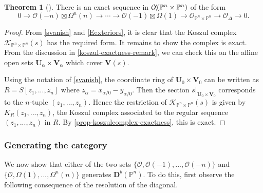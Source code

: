 \documentclass[a4paper]{article}
\theoremstyle{definition}
\newtheorem{theorem}[defn]{Theorem}
\theoremstyle{remark}
\newcommand{\deri}{\mathbf{D}}
\newcommand{\Pn}{\ensuremath{{\mathbb{P}^n}}}
\DeclareMathOperator{\coh}{\mathcal{C\kern -2pt o\kern -2pt h\kern -1pt}}
\begin{document}
\begin{theorem}[]\label{resolution-of-diagonal}
    There is an exact sequence in \(\coh(\Pn \times \Pn)\) of the form 
    \[0\rightarrow \mathscr{O}(-n)\boxtimes \Omega^n(n)
    \rightarrow \cdots \rightarrow \mathscr{O}(-1)\boxtimes 
    \Omega(1) \rightarrow \mathscr{O}_{\Pn\times \Pn} \rightarrow \mathscr{O}_\Delta
    \rightarrow 0.\]
    \begin{proof} 
        From \cref{svanish} and \cref{Eexteriors}, it is clear that the Koszul
        complex \(\mathscr{K}_{\Pn\times \Pn}(s)\) has the required form. It
        remains to show the complex is exact. From the discussion in
        \cref{koszul-exactness-remark}, we can check this on the affine open
        sets \(\mathbf{U}_\alpha \times \mathbf{V}_\alpha\) which cover
        \(\mathbf{V}(s)\). 

        Using the notation of \cref{svanish}, the coordinate ring of
        \(\mathbf{U}_0\times \mathbf{V}_0\) can be written as
        \(R=S[z_1,...,z_n]\) where \(z_\alpha = x_{\alpha/0}-y_{\alpha/0}\).
        Then the section \(s\big|_{\mathbf{U}_0\times \mathbf{V}_0}\)
        corresponds to the \(n\)-tuple \((z_1,...,z_n)\). Hence the restriction
        of \(\mathscr{K}_{\Pn\times\Pn}(s)\) is given by \(K_R(z_1,...,z_n)\),
        the Koszul complex associated to the regular sequence \((z_1,...,z_n)\)
        in \(R\). By \cref{prop-koszulcomplex-exactness}, this is exact.
    \end{proof}
\end{theorem}

\subsubsection{Generating the category} 
We now show that either of the two sets
\(\{\mathscr{O},\mathscr{O}(-1),...,\mathscr{O}(-n)\}\) and \(\{\mathscr{O},
\Omega(1),...,\Omega^n(n)\}\) generates \(\deri^b(\Pn)\). To do this, first
observe the following consequence of the resolution of the diagonal.
\end{document}
